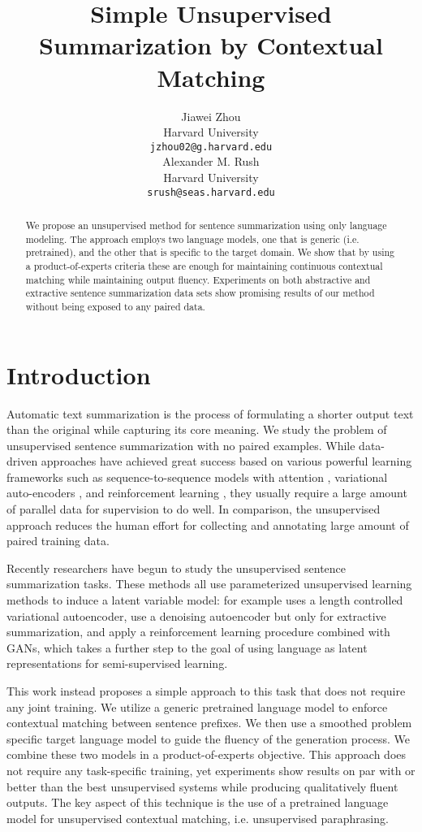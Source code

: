 \documentclass[11pt,a4paper]{article}
\title{Simple Unsupervised Summarization by Contextual Matching}
\author{Jiawei Zhou \\
  Harvard University \\ \texttt{jzhou02@g.harvard.edu} \\\And
  Alexander M. Rush \\
  Harvard University \\ \texttt{srush@seas.harvard.edu} \\}
\date{}
\begin{document}
\maketitle
\begin{abstract}
We propose an unsupervised method for sentence summarization using only language modeling.
The approach employs two language models, one that is generic (i.e. pretrained), and the other that is specific to the target domain.
We show that by using a product-of-experts criteria these are enough for  maintaining continuous contextual matching while 
maintaining output fluency. Experiments on both abstractive and extractive sentence summarization data sets show promising results of our method without being exposed to any paired data.

\end{abstract}

\section{Introduction}

Automatic text summarization is the process of formulating a shorter output text than the original while capturing its core meaning. 
We study the problem of unsupervised sentence summarization with no paired examples. While data-driven approaches have achieved great success based on various powerful learning frameworks such as sequence-to-sequence models with attention \cite{rush2015neural, chopra2016abstractive, nallapati2016abstractive}, variational auto-encoders \cite{miao2016language}, and reinforcement learning \cite{paulus2017deep}, they usually require a large amount of parallel data for supervision to do well. In comparison, the unsupervised approach reduces the human effort for collecting and annotating large amount of paired training data.

Recently researchers have begun to study the unsupervised sentence summarization tasks. 
These methods all use parameterized unsupervised learning methods to induce a latent variable model: for example 
\citet{schumann2018unsupervised} uses a length controlled variational autoencoder, \citet{fevry2018unsupervised} use a denoising autoencoder but only for extractive summarization, and \citet{wang2018learning} apply a reinforcement learning procedure combined with GANs, which takes a further step to the goal of  \citet{miao2016language} using language as latent representations for semi-supervised learning.

This work instead proposes a simple approach to this task that does not require any joint training. 
 We utilize a generic pretrained language model to enforce contextual matching between sentence prefixes. We then use a smoothed problem specific target language model to guide the fluency of the generation process. We combine these two models in a product-of-experts objective.
This approach does not require any task-specific training, yet experiments show results on par with or better than the best unsupervised systems while producing qualitatively fluent outputs. The key aspect of this technique is the use of a
pretrained language model for unsupervised contextual matching, i.e. unsupervised paraphrasing.
\end{document}
